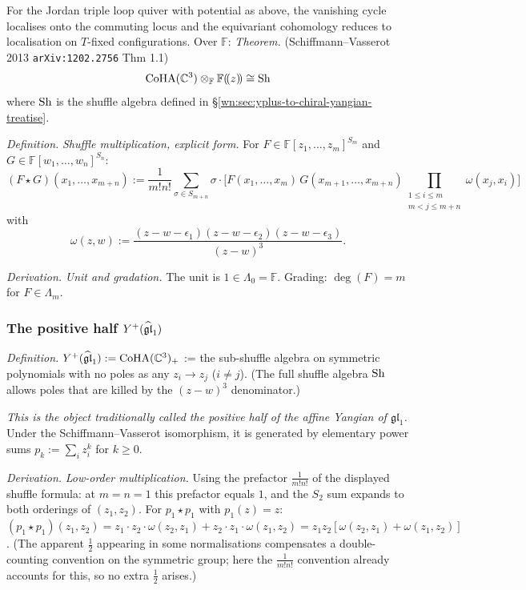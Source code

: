 For the Jordan triple loop quiver with potential as above, the vanishing cycle
localises onto the commuting locus and the equivariant cohomology reduces to
localisation on $T$-fixed configurations. Over $\mathbb{F}$:
\emph{Theorem.} (Schiffmann--Vasserot 2013 \texttt{arXiv:1202.2756} Thm 1.1)
\[
\mathrm{CoHA}(\mathbb{C}^3) \otimes_\mathbb{F} \mathbb{F}(\!(z)\!) \cong \mathrm{Sh}
\]
where $\mathrm{Sh}$ is the shuffle algebra defined in §\ref{wn:sec:yplus-to-chiral-yangian-treatise}.

\emph{Definition.} \emph{Shuffle multiplication, explicit form.}
For $F \in \mathbb{F}[z_1, \ldots, z_m]^{S_m}$ and $G \in \mathbb{F}[w_1, \ldots, w_n]^{S_n}$:
\[
(F \star G)(x_1, \ldots, x_{m+n}) :=
\frac{1}{m! n!} \sum_{\sigma \in S_{m+n}} \sigma \cdot \!\Big[
F(x_1, \ldots, x_m)\, G(x_{m+1}, \ldots, x_{m+n})
\prod_{\substack{1 \leq i \leq m \\ m < j \leq m+n}} \omega(x_j, x_i) \Big]
\]
with
\[
\omega(z, w) := \frac{(z - w - \epsilon_1)(z - w - \epsilon_2)(z - w - \epsilon_3)}{(z - w)^3}.
\]

\emph{Derivation.} \emph{Unit and gradation.}
The unit is $1 \in \Lambda_0 = \mathbb{F}$. Grading: $\deg(F) = m$ for $F \in \Lambda_m$.

\subsubsection{The positive half $Y^+(\widehat{\mathfrak{gl}}_1)$}

\emph{Definition.} $Y^+(\widehat{\mathfrak{gl}}_1) := \mathrm{CoHA}(\mathbb{C}^3)_+$ := the sub-shuffle algebra
on symmetric polynomials with no poles as any $z_i \to z_j$ ($i \neq j$). (The full
shuffle algebra $\mathrm{Sh}$ allows poles that are killed by the $(z - w)^3$ denominator.)

\emph{This is the object traditionally called the positive half of the affine Yangian
of $\mathfrak{gl}_1$.} Under the Schiffmann--Vasserot isomorphism, it is generated by
elementary power sums $p_k := \sum_i z_i^k$ for $k \geq 0$.

\emph{Derivation.} \emph{Low-order multiplication.}
Using the prefactor $\tfrac{1}{m! n!}$ of the displayed shuffle formula: at $m = n = 1$
this prefactor equals $1$, and the $S_2$ sum expands to both orderings of $(z_1, z_2)$.
For $p_1 \star p_1$ with $p_1(z) = z$:
$(p_1 \star p_1)(z_1, z_2) = z_1 \cdot z_2 \cdot \omega(z_2, z_1)
+ z_2 \cdot z_1 \cdot \omega(z_1, z_2)
= z_1 z_2 [\omega(z_2, z_1) + \omega(z_1, z_2)]$.
(The apparent $\tfrac{1}{2}$ appearing in some normalisations compensates a double-counting
convention on the symmetric group; here the $\tfrac{1}{m!n!}$ convention already accounts
for this, so no extra $\tfrac{1}{2}$ arises.)

